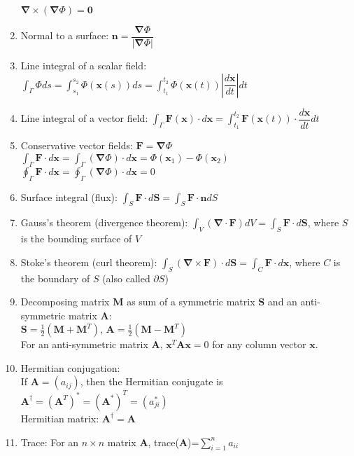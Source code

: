 \documentclass[fleqn]{article}
\begin{document}
\begin{enumerate}
        $\bm{\nabla}\times(\bm{\nabla}\Phi)=\bm{0}$
    \item Normal to a surface:\smallbreak
        $\bm{n}=\dfrac{\bm{\nabla}\Phi}{|\bm{\nabla}\Phi|}$
    \item Line integral of a scalar field:\smallbreak
        $\displaystyle\int_\Gamma\Phi ds=\displaystyle\int_{s_1}^{s_2}\Phi(\bm{x}(s))ds=\displaystyle\int_{t_1}^{t_2}\Phi(\bm{x}(t))\left|\dfrac{d\bm{x}}{dt}\right|dt$
    \item Line integral of a vector field:\smallbreak
        $\displaystyle\int_\Gamma\bm{F}(\bm{x})\cdot d\bm{x}=\displaystyle\int_{t_1}^{t_2}\bm{F}(\bm{x}(t))\cdot\dfrac{d\bm{x}}{dt}dt$
    \item Conservative vector fields: $\bm{F}=\bm{\nabla}\Phi$\smallbreak
        $\displaystyle\int_\Gamma\bm{F}\cdot d\bm{x}=\displaystyle\int_\Gamma(\bm{\nabla}\Phi)\cdot d\bm{x}=\Phi(\bm{x}_1)-\Phi(\bm{x}_2)$\smallbreak
        $\displaystyle\oint_\Gamma\bm{F}\cdot d\bm{x}=\displaystyle\oint_\Gamma(\bm{\nabla}\Phi)\cdot d\bm{x}=0$
    \item Surface integral (flux):\smallbreak
        $\displaystyle\int_S\bm{F}\cdot d\bm{S}=\displaystyle\int_S\bm{F}\cdot\bm{n}dS$
    \item Gauss's theorem (divergence theorem):\smallbreak
        $\displaystyle\int_V(\bm{\nabla}\cdot\bm{F})dV=\displaystyle\int_S\bm{F}\cdot d\bm{S}$, where $S$ is the bounding surface of $V$
    \item Stoke's theorem (curl theorem):\smallbreak
        $\displaystyle\int_S(\bm{\nabla}\times\bm{F})\cdot d\bm{S}=\displaystyle\int_C\bm{F}\cdot d\bm{x}$, where $C$ is the boundary of $S$ (also called $\partial S$)
    \newpage
    \item Decomposing matrix $\bm{M}$ as sum of a symmetric matrix $\bm{S}$ and an anti-symmetric matrix $\bm{A}$: \\
        $\bm{S}=\frac{1}{2}(\bm{M}+\bm{M}^T)$, $\bm{A}=\frac{1}{2}(\bm{M}-\bm{M}^T)$\\
        For an anti-symmetric matrix $\bm{A}$, $\bm{x}^T\bm{Ax}=0$ for any column vector $\bm{x}$.
    \item Hermitian conjugation:\\
        If $\bm{A}=(a_{ij})$, then the Hermitian conjugate is $\bm{A}^\dagger=(\bm{A}^T)^*=(\bm{A}^*)^T=(a^*_{ji})$\\
        Hermitian matrix: $\bm{A}^\dagger=\bm{A}$
    \item Trace: 
        For an $n\times n$ matrix $\bm{A}$, trace($\bm{A}$)=$\displaystyle\sum_{i=1}^n a_{ii}$\\

\end{enumerate}
\end{document}
